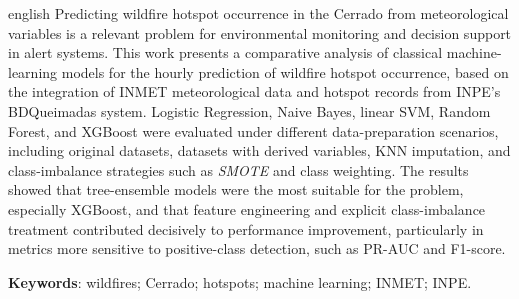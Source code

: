 \begin{resumo}[Abstract]
\begin{otherlanguage*}{english}
Predicting wildfire hotspot occurrence in the Cerrado from meteorological variables is a relevant problem for environmental monitoring and decision support in alert systems. This work presents a comparative analysis of classical machine-learning models for the hourly prediction of wildfire hotspot occurrence, based on the integration of INMET meteorological data and hotspot records from INPE's BDQueimadas system. Logistic Regression, Naive Bayes, linear SVM, Random Forest, and XGBoost were evaluated under different data-preparation scenarios, including original datasets, datasets with derived variables, KNN imputation, and class-imbalance strategies such as \textit{SMOTE} and class weighting. The results showed that tree-ensemble models were the most suitable for the problem, especially XGBoost, and that feature engineering and explicit class-imbalance treatment contributed decisively to performance improvement, particularly in metrics more sensitive to positive-class detection, such as PR-AUC and F1-score.
\medskip

\textbf{Keywords}: wildfires; Cerrado; hotspots; machine learning; INMET; INPE.
\end{otherlanguage*}
\end{resumo}